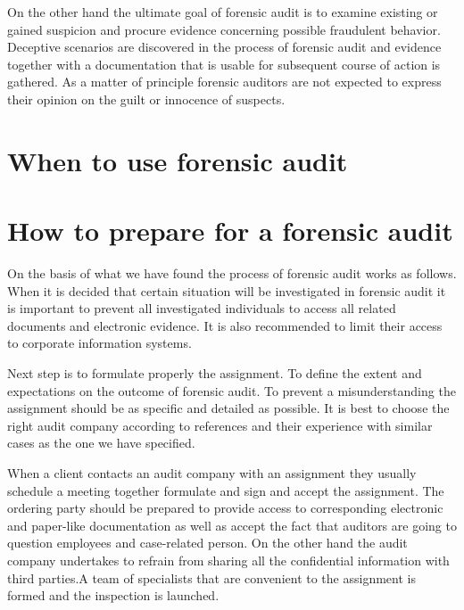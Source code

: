 On the other hand the ultimate goal of forensic audit is to examine existing or gained suspicion and procure evidence concerning possible fraudulent behavior. Deceptive scenarios are discovered in the process of forensic audit and evidence together with a documentation that is usable for subsequent course of action is gathered. As a matter of principle forensic auditors are not expected to express their opinion on the guilt or innocence of suspects.


\section{When to use forensic audit}
\sediva{\blindtext}


\section{How to prepare for a forensic audit}

On the basis of what we have found the process of forensic audit works as follows. When it is decided that certain situation will be investigated in forensic audit it is important to prevent all investigated individuals to access all related documents and electronic evidence. It is also recommended to limit their access to corporate information systems. 

Next step is to formulate properly the assignment. To define the extent and expectations on the outcome of forensic audit. To prevent a misunderstanding the assignment should be as specific and detailed as possible. It is best to choose the right audit company according to references and their experience with similar cases as the one we have specified.

When a client contacts an audit company with an assignment they usually schedule a meeting together formulate and sign and accept the assignment. The ordering party should be prepared to provide access to corresponding electronic and paper-like documentation as well as accept the fact that auditors are going to question employees and case-related person. On the other hand the audit company undertakes to refrain from sharing all the confidential information with third parties.A team of specialists that are convenient to the assignment is formed and the inspection is launched. 

